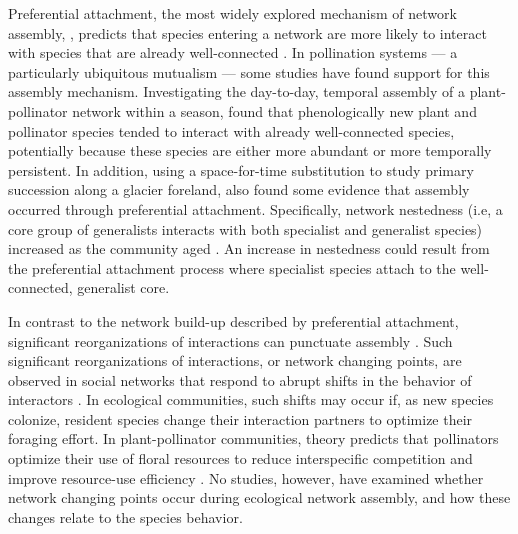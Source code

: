 \documentclass[12pt]{article}
\begin{document}
Preferential attachment, the most widely explored mechanism of network
assembly, \citep{barabasi1999emergence}, predicts that species
entering a network are more likely to interact with species that are
already well-connected \citep[''the rich-get-richer''
principle,][]{barabasi1999emergence}. In pollination systems --- a
particularly ubiquitous mutualism \citep{ollerton-2011-321,
  klein-2007-303} --- some studies have found support for this
assembly mechanism. Investigating the day-to-day, temporal assembly of
a plant-pollinator network within a season, \cite{Olesen2008} found
that phenologically new plant and pollinator species tended to
interact with already well-connected species, potentially because
these species are either more abundant or more temporally
persistent. In addition, using a space-for-time substitution to study
primary succession along a glacier foreland, \cite{albrecht2010plant}
also found some evidence that assembly occurred through preferential
attachment. Specifically, network nestedness (i.e, a core group of
generalists interacts with both specialist and generalist species)
increased as the community aged \citep{albrecht2010plant}.  An
increase in nestedness could result from the preferential attachment
process where specialist species attach to the well-connected,
generalist core.

In contrast to the network build-up described by preferential
attachment, significant reorganizations of interactions can punctuate
assembly \citep{peel2014detecting}. Such significant reorganizations
of interactions, or network changing points, are observed in social
networks that respond to abrupt shifts in the behavior of interactors
\citep{peel2014detecting}. In ecological communities, such shifts may
occur if, as new species colonize, resident species change their
interaction partners to optimize their foraging effort. In
plant-pollinator communities, theory predicts that pollinators
optimize their use of floral resources to reduce interspecific
competition and improve resource-use efficiency
\citep{pyke1984optimal, valdovinos2010consequences,
  valdovinos2013adaptive, albrecht2010plant, Bluthgen2007}. No
studies, however, have examined whether network changing points occur
during ecological network assembly, and how these changes relate to
the species behavior.
\end{document}
